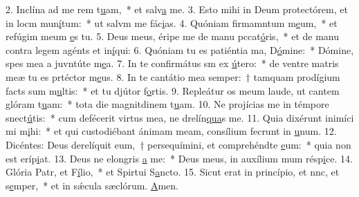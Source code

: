 2. Inclína ad me rem t\uline{u}am,~* et salv\uline{a} me.
3. Esto mihi in Deum protectórem, et in locm mun\uline{í}tum:~* ut salvm me fác\uline{i}as.
4. Quóniam firmamntum m\uline{e}um,~* et refúgim meum \uline{e}s tu.
5. Deus meus, éripe me de manu pccat\uline{ó}ris,~* et de manu contra legem agénts et in\uline{í}qui:
6. Quóniam tu es patiéntia ma, D\uline{ó}mine:~* Dómine, spes mea a juvntúte m\uline{e}a.
7. In te confirmátus sm ex \uline{ú}tero:~* de ventre matris meæ tu es prtéctor m\uline{e}us.
8. In te cantátio mea semper:~† tamquam prodígium facts sum m\uline{u}ltis:~* et tu djútor f\uline{o}rtis.
9. Repleátur os meum laude, ut cantem glóram t\uline{u}am:~* tota die magnitdinem t\uline{u}am.
10. Ne projícias me in témpore snect\uline{ú}tis:~* cum defécerit virtus mea, ne drelín\uline{qua}s me.
11. Quia dixérunt inimíci mi m\uline{i}hi:~* et qui custodiébant ánimam meam, consílium fecrunt in \uline{u}num.
12. Dicéntes: Deus derelíquit eum,~† persequímini, et comprehéndte \uline{e}um:~* quia non est  eríp\uline{i}at.
13. Deus ne elongris \uline{a} me:~* Deus meus, in auxílium mum résp\uline{i}ce.
14. Glória Patr, et F\uline{í}lio,~* et Spirtui S\uline{a}ncto.
15. Sicut erat in princípio, et nnc, et s\uline{e}mper,~* et in sǽcula sæclórum. \uline{A}men.
